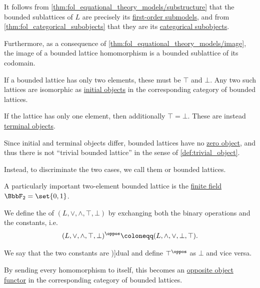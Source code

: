 \begin{definition}
\begin{thmenum}
    It follows from \cref{thm:fol_equational_theory_models/substructure} that the bounded sublattices of \( L \) are precisely its \hyperref[def:fol_substructure/submodel]{first-order submodels}, and from \cref{thm:fol_categorical_subobjects} that they are its \hyperref[def:categorical_subobject]{categorical subobjects}.

    Furthermore, as a consequence of \cref{thm:fol_equational_theory_models/image}, the image of a bounded lattice homomorphism is a bounded sublattice of its codomain.

    \mimprovised If a bounded lattice has only two elements, these must be \( \top \) and \( \bot \). Any two such lattices are isomorphic as \hyperref[def:universal_objects/initial]{initial objects} in the corresponding category of bounded lattices.

    If the lattice has only one element, then additionally \( \top = \bot \). These are instead \hyperref[def:universal_objects/terminal]{terminal objects}.

    Since initial and terminal objects differ, bounded lattices have no \hyperref[def:universal_objects/zero]{zero object}, and thus there is not \enquote{trivial bounded lattice} in the sense of \cref{def:trivial_object}.

    Instead, to discriminate the two cases, we call them  or  bounded lattices.

    A particularly important two-element bounded lattice is the \hyperref[def:finite_field]{finite field} \( \BbbF_2 = \set{ 0, 1 } \).

    \mimprovised We define the  of \( (L, \vee, \wedge, \top, \bot) \) by exchanging both the binary operations and the constants, i.e.
    \begin{equation*}
      (L, \vee, \wedge, \top, \bot)^\oppos \coloneqq (L, \wedge, \vee, \bot, \top).
    \end{equation*}

    We say that the two constants are \term[en=dual (constants) (\cite[193]{Gottschalk1953Quaternality})]{dual} and define \( \top^\oppos \) as \( \bot \) and vice versa.

    By sending every homomorphism to itself, this becomes an \hyperref[con:opposite_object]{opposite object functor} in the corresponding category of bounded lattices.
  \end{thmenum}
\end{definition}

